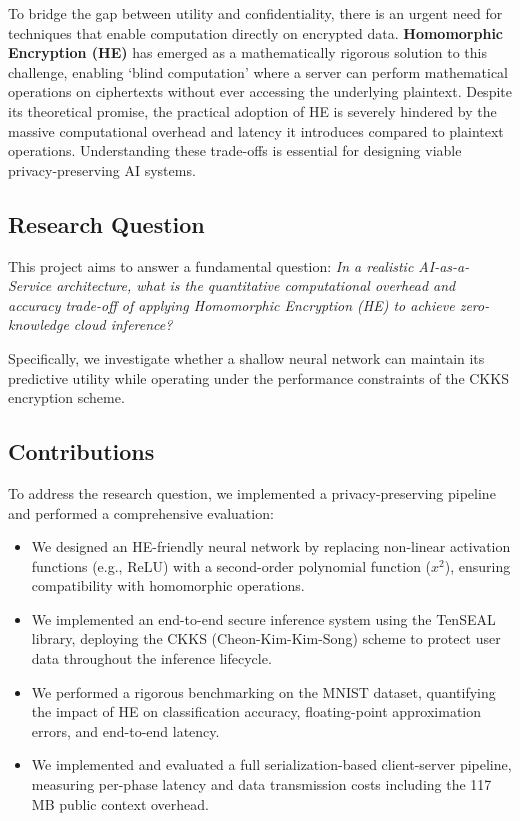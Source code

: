 \documentclass[runningheads]{llncs}
\begin{document}
To bridge the gap between utility and confidentiality, there is an urgent need for techniques that enable computation directly on encrypted data. \textbf{Homomorphic Encryption (HE)} has emerged as a mathematically rigorous solution to this challenge, enabling `blind computation' where a server can perform mathematical operations on ciphertexts without ever accessing the underlying plaintext. Despite its theoretical promise, the practical adoption of HE is severely hindered by the massive computational overhead and latency it introduces compared to plaintext operations. Understanding these trade-offs is essential for designing viable privacy-preserving AI systems.

\subsection{Research Question}
This project aims to answer a fundamental question: \textit{In a realistic AI-as-a-Service architecture, what is the quantitative computational overhead and accuracy trade-off of applying Homomorphic Encryption (HE) to achieve zero-knowledge cloud inference?}

Specifically, we investigate whether a shallow neural network can maintain its predictive utility while operating under the performance constraints of the CKKS encryption scheme.

\subsection{Contributions}
To address the research question, we implemented a privacy-preserving pipeline and performed a comprehensive evaluation:
\begin{itemize}
    \item We designed an HE-friendly neural network by replacing non-linear activation functions (e.g., ReLU) with a second-order polynomial function ($x^2$), ensuring compatibility with homomorphic operations.
    \item We implemented an end-to-end secure inference system using the TenSEAL library\cite{ref_tenseal}, deploying the CKKS (Cheon-Kim-Kim-Song) scheme\cite{ref_ckks} to protect user data throughout the inference lifecycle.
    \item We performed a rigorous benchmarking on the MNIST dataset, quantifying the impact of HE on classification accuracy, floating-point approximation errors, and end-to-end latency.
    \item We implemented and evaluated a full serialization-based client-server pipeline, measuring per-phase latency and data transmission costs including the 117 MB public context overhead.
\end{itemize}
\end{document}

